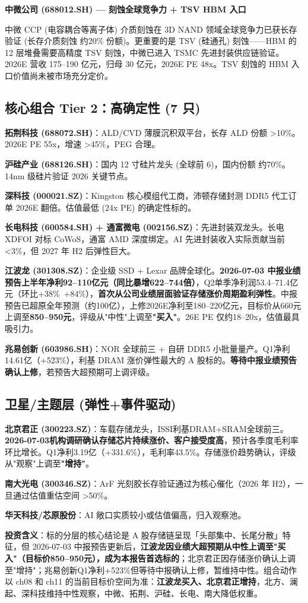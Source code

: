 \textbf{中微公司 (688012.SH) — 刻蚀全球竞争力 + TSV HBM 入口}
\par 中微 CCP (电容耦合等离子体) 介质刻蚀在 3D NAND 领域全球竞争力已获长存验证 (长存介质刻蚀 约20\% 份额)。更重要的是 TSV (硅通孔) 刻蚀——HBM 的 12 层堆叠需要高精度 TSV 刻蚀，中微已进入 TSMC 先进封装供应链验证。2026E 营收 175--190 亿元，归母 30 亿元，2026E PE 48x。TSV 刻蚀的 HBM 入口价值尚未被市场充分定价。

\subsection{核心组合 Tier 2：高确定性 (7 只)}

\textbf{拓荆科技 (688072.SH)}：ALD/CVD 薄膜沉积双平台，长存 ALD 份额 >10\%。2026E PE 55x，增速 >45\%，PEG 合理。
\par \textbf{沪硅产业 (688126.SH)}：国内 12 寸硅片龙头 (全球前 6)，国内份额 约70\%。14nm 级硅片验证 2026 关键节点。
\par \textbf{深科技 (000021.SZ)}：Kingston 核心模组代工商，沛顿存储封测 DDR5 代工订单 2026E 翻倍。估值最低 (24x PE) 的确定性标的。
\par \textbf{长电科技 (600584.SH) + 通富微电 (002156.SZ)}：先进封装双龙头。长电 XDFOI 对标 CoWoS，通富 AMD 深度绑定。AI 先进封装收入实际贡献当前 <3\%，但 2027 年 H2 后弹性巨大。
\par \textbf{江波龙 (301308.SZ)}：企业级 SSD + Lexar 品牌全球化。\textbf{2026-07-03 中报业绩预告上半年净利92--110亿元（同比暴增622--744倍）}，Q2单季净利润53.4--71.4亿元（环比+38\%~+84\%），\textbf{首次从公司业绩层面验证存储涨价周期盈利弹性}。中报预告已超原全年预测（约100亿），上修2026E净利至180--220亿元，目标价从660元上调至\textbf{850--950元}，评级从"中性"上调至\textbf{"买入"}。26E PE 仅约18--20x，估值最具吸引力。
\par \textbf{兆易创新 (603986.SH)}：NOR 全球前三 + 自研 DDR5 小批量量产。Q1净利14.61亿（+523\%），利基 DRAM 涨价弹性最大的 A 股标的。\textbf{等待中报业绩预告确认上修}，若预告大超预期可上调评级。

\subsection{卫星/主题层 (弹性+事件驱动)}

\textbf{北京君正 (300223.SZ)}：车载存储龙头，ISSI利基DRAM+SRAM全球前三。\textbf{2026-07-03机构调研确认存储芯片持续涨价、客户接受度高}，预计各季度毛利率环比增长。Q1净利3.19亿（+331.6\%），毛利率43.5\%。存储涨价趋势确认，评级从"观察"上调至\textbf{"增持"}。
\par \textbf{南大光电 (300346.SZ)}：ArF 光刻胶长存验证通过为核心催化（2026 年 H2），一旦通过估值重估空间 >50\%。\par
\textbf{华天科技/芯原股份}：AI 敞口实质较小或估值偏高，归入观察池。

\vspace{0.4em}
\noindent\textbf{投资含义}：标的分层的核心结论是 A 股存储链呈现「头部集中、长尾分散」特征，但 2026-07-03 中报预告更新后，\textbf{江波龙因业绩大超预期从中性上调至"买入"（目标价850--950元），成为本报告首选标的}；北京君正因存储涨价确认上调至"增持"；兆易创新Q1净利+523\%但等待中报确认上修，暂维持中性。组合动作以 ch08 和 ch11 的当前目标价空间为准：\textbf{江波龙买入、北京君正增持}，北方、澜起、深科技维持中性观察，中微、拓荆、沪硅、长电、南大降低权重。
